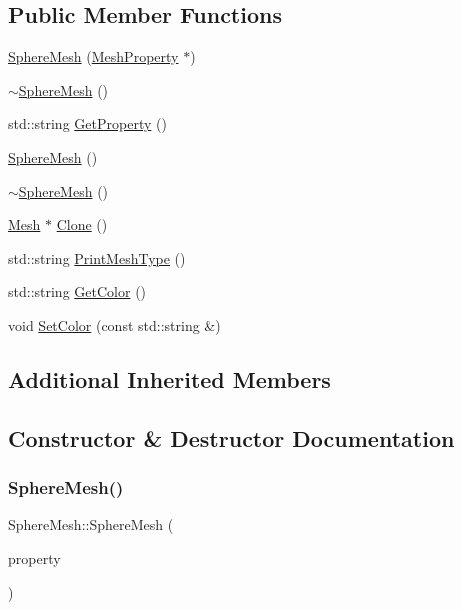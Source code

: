 \subsection*{Public Member Functions}
\begin{DoxyCompactItemize}
\item 
\mbox{\hyperlink{class_sphere_mesh_a25793f8f99f99a0cbc12176f0605f8ff}{Sphere\+Mesh}} (\mbox{\hyperlink{class_mesh_property}{Mesh\+Property}} $\ast$)
\item 
\mbox{\hyperlink{class_sphere_mesh_a7cfb19d071eed16544d3c01c63280399}{$\sim$\+Sphere\+Mesh}} ()
\item 
std\+::string \mbox{\hyperlink{class_sphere_mesh_a803470d419de41ffd75d6b932a819a06}{Get\+Property}} ()
\item 
\mbox{\hyperlink{class_sphere_mesh_a96328df52e8e6e34ad043c4131579947}{Sphere\+Mesh}} ()
\item 
\mbox{\hyperlink{class_sphere_mesh_a7cfb19d071eed16544d3c01c63280399}{$\sim$\+Sphere\+Mesh}} ()
\item 
\mbox{\hyperlink{class_mesh}{Mesh}} $\ast$ \mbox{\hyperlink{class_sphere_mesh_a5dfa031b4cdd31a81154221c882a5dfa}{Clone}} ()
\item 
std\+::string \mbox{\hyperlink{class_sphere_mesh_ad40fa08f33e72acf0410c2ce6099ca4c}{Print\+Mesh\+Type}} ()
\item 
std\+::string \mbox{\hyperlink{class_sphere_mesh_a1c490b89552f51b7960dc760ac09edf8}{Get\+Color}} ()
\item 
void \mbox{\hyperlink{class_sphere_mesh_a8e9e0a923060501e12f278508ac96f13}{Set\+Color}} (const std\+::string \&)
\end{DoxyCompactItemize}
\subsection*{Additional Inherited Members}


\subsection{Constructor \& Destructor Documentation}
\mbox{\label{class_sphere_mesh_a25793f8f99f99a0cbc12176f0605f8ff}} 
\subsubsection{\texorpdfstring{SphereMesh()}{SphereMesh()}\hspace{0.1cm}{\footnotesize\ttfamily [1/2]}}
{\footnotesize\ttfamily Sphere\+Mesh\+::\+Sphere\+Mesh (\begin{DoxyParamCaption}\item[{\mbox{\hyperlink{class_mesh_property}{Mesh\+Property}} $\ast$}]{property }\end{DoxyParamCaption})}

